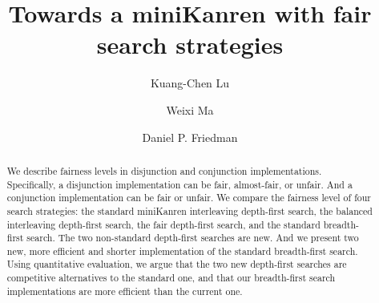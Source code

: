 \documentclass[format=acmlarge, review=true, authordraft=true]{acmart}
\title{Towards a miniKanren with fair search strategies}
\author{Kuang-Chen Lu}
\affiliation{Indiana University}
\author{Weixi Ma}
\affiliation{Indiana University}
\author{Daniel P. Friedman}
\affiliation{Indiana University}
\newcommand{\conde}{\texttt{cond$^e$}}
\newcommand{\conj}{\texttt{conj}}
\newcommand{\disj}{\texttt{disj}}
\newcommand{\DFSi }[0]{DFS$_{i}$}
\newcommand{\DFSf }[0]{DFS$_{f}$}
\newcommand{\DFSbi}[0]{DFS$_{bi}$}
\newcommand{\BFSser}[0]{BFS}
\begin{document}

\begin{abstract}

We describe fairness levels in disjunction and conjunction
implementations.  Specifically, a disjunction implementation can be
fair, almost-fair, or unfair. And a conjunction implementation can
be fair or unfair.  We compare the fairness level of four search
strategies: the standard miniKanren interleaving depth-first search,
the balanced interleaving depth-first search, the fair depth-first
search, and the standard breadth-first search.
The two non-standard depth-first searches are new. And we present two new, more 
efficient and shorter implementation of the standard breadth-first search. 
Using 
quantitative evaluation, we argue that the two new depth-first searches are 
competitive alternatives to the standard one, 
and that our breadth-first search implementations are more efficient than 
the current one.




% 

\end{abstract}
\end{document}
